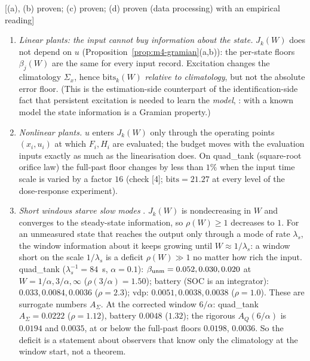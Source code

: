 \begin{proposition}\label{prop:m4-excitation}
[(a), (b) proven; (c) proven; (d) proven (data processing) with an empirical reading]
\begin{enumerate}
\item[(a)] \emph{Linear plants: the input cannot buy information about the state.} $J_k(W)$ does not depend on
$u$ (Proposition~\ref{prop:m4-gramian}(a,b)): the per-state floors $\beta_j(W)$ are the same for every input
record. Excitation changes the climatology $\Sigma_x$, hence $\mathrm{bits}_k(W)$ \emph{relative to climatology},
but not the absolute error floor. (This is the estimation-side counterpart of the identification-side fact that
persistent excitation is needed to learn the \emph{model}, \citealp[Ch.~13]{ljung1999system}: with a known model
the state information is a Gramian property.)
\item[(b)] \emph{Nonlinear plants.} $u$ enters $J_k(W)$ only through the operating points $(x_i,u_i)$ at which
$F_i,H_i$ are evaluated; the budget moves with the evaluation inputs exactly as much as the linearisation does.
On quad\_tank (square-root orifice law) the full-past floor changes by less than $1\%$ when the input time scale is
varied by a factor $16$ (check [4]; $\mathrm{bits}=21.27$ at every level of the dose-response experiment).
\item[(c)] \emph{Short windows starve slow modes} . $J_k(W)$ is nondecreasing in $W$ and converges to the
steady-state information, so $\rho(W)\ge1$ decreases to $1$. For an unmeasured state that reaches the output only
through a mode of rate $\lambda_s$, the window information about it keeps growing until $W\approx1/\lambda_s$: a
window short on the scale $1/\lambda_s$ is a deficit $\rho(W)\gg1$ no matter how rich the input. quad\_tank
($\lambda_s^{-1}=84$~s, $\alpha=0.1$): $\beta_{\rm unm}=0.052,0.030,0.020$ at $W=1/\alpha,3/\alpha,\infty$
($\rho(3/\alpha)=1.50$); battery (SOC is an integrator): $0.033,0.0084,0.0036$ ($\rho=2.3$); vdp: $0.0051,0.0038,0.0038$
($\rho=1.0$). These are surrogate numbers $A_\Sigma$. At the corrected window $6/\alpha$: quad\_tank $A_\Sigma=0.0222$
($\rho=1.12$), battery $0.0048$ ($1.32$); the rigorous $A_Q(6/\alpha)$ is $0.0194$ and $0.0035$, at or below the
full-past floors $0.0198$, $0.0036$. So the deficit is a statement about observers that know only the climatology at the
window start, not a theorem.

\end{enumerate}
\end{proposition}
